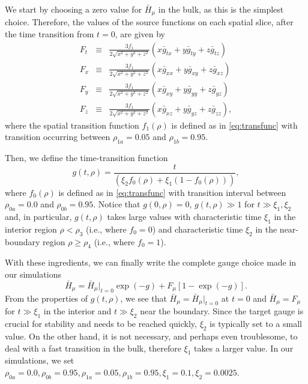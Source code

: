 \documentclass[a4paper,11pt]{article}
\numberwithin{equation}{section}
\begin{document}
We start by choosing a zero value for $\bar{H}_\mu$ in the bulk, as this is the simplest choice. Therefore, the values of the source functions on each spatial slice, after the time transition from $t=0$, are given by
\begin{eqnarray}
\label{eqn:extend_gauge_txyz}
F_t&\equiv&\frac{3f_1}{2\sqrt{x^2+y^2+z^2}}(x \bar{g}_{tx}+y\bar{g}_{ty}+z\bar{g}_{tz}) \nonumber \\
F_x&\equiv&\frac{3f_1}{2\sqrt{x^2+y^2+z^2}}(x \bar{g}_{xx}+y\bar{g}_{xy}+z\bar{g}_{xz}) \nonumber \\
F_y&\equiv&\frac{3f_1}{2\sqrt{x^2+y^2+z^2}}(x \bar{g}_{xy}+y\bar{g}_{yy}+z\bar{g}_{yz}) \nonumber \\
F_z&\equiv&\frac{3f_1}{2\sqrt{x^2+y^2+z^2}}(x \bar{g}_{xz}+y\bar{g}_{yz}+z\bar{g}_{zz}),
\end{eqnarray}
where the spatial transition function $f_1(\rho)$ is defined as in \eqref{eq:transfunc} with transition occurring between $\rho_{1a}=0.05$ and $\rho_{1b}=0.95$.

Then, we define the time-transition function
\begin{equation}
g(t,\rho)=\frac{t}{(\xi_2 f_0(\rho)+\xi_1(1-f_0(\rho)))},
\end{equation}
where $f_0(\rho)$ is defined as in \eqref{eq:transfunc} with transition interval between $\rho_{0a}=0.0$ and $\rho_{0b}=0.95$. Notice that $g(0,\rho)=0$, $g(t,\rho)\gg 1$ for $t\gg\xi_1,\xi_2$ and, in particular, $g(t,\rho)$ takes large values with characteristic time $\xi_1$ in the interior region $\rho<\rho_3$ (i.e., where $f_0=0$) and characteristic time $\xi_2$ in the near-boundary region $\rho\geq\rho_4$ (i.e., where $f_0=1$).

With these ingredients, we can finally write the complete gauge choice made in our simulations
\begin{equation}
\bar{H}_\mu=\bar{H}_{\mu}\big|_{t=0}\exp(-g)+F_\mu[1- \exp(-g)].
\end{equation}
From the properties of $g(t,\rho)$, we see that $\bar{H}_\mu=\bar{H}_{\mu}|_{t=0}$ at $t=0$ and $\bar{H}_\mu=F_\mu$ for $t\gg\xi_1$ in the interior and $t\gg\xi_2$ near the boundary. Since the target gauge is crucial for stability and needs to be reached quickly, $\xi_2$ is typically set to a small value. On the other hand, it is not necessary, and perhaps even troublesome, to deal with a fast transition in the bulk, therefore $\xi_1$ takes a larger value. In our simulations, we set $\rho_{0a}=0.0,\rho_{0b}=0.95,\rho_{1a}=0.05,\rho_{1b}=0.95,\xi_1=0.1,\xi_2=0.0025$.
\end{document}

